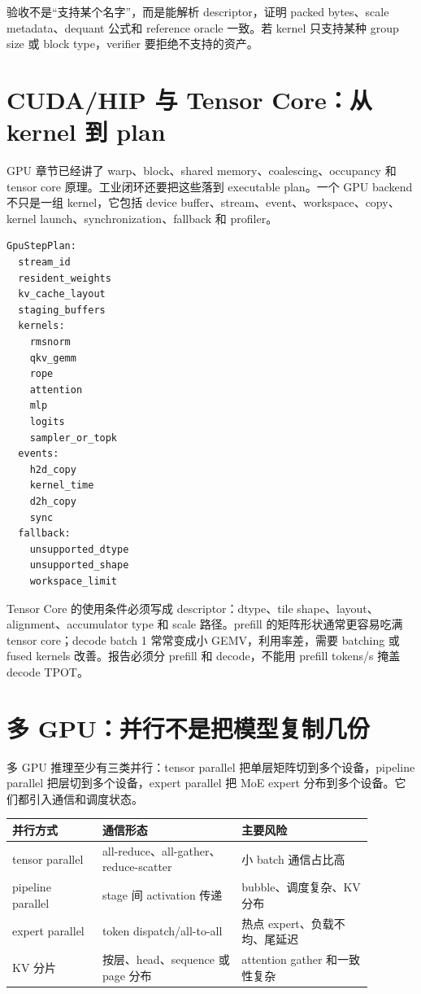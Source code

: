 验收不是“支持某个名字”，而是能解析 descriptor，证明 packed bytes、scale metadata、dequant 公式和 reference oracle 一致。若 kernel 只支持某种 group size 或 block type，verifier 要拒绝不支持的资产。

\section{CUDA/HIP 与 Tensor Core：从 kernel 到 plan}

GPU 章节已经讲了 warp、block、shared memory、coalescing、occupancy 和 tensor core 原理。工业闭环还要把这些落到 executable plan。一个 GPU backend 不只是一组 kernel，它包括 device buffer、stream、event、workspace、copy、kernel launch、synchronization、fallback 和 profiler。

\begin{lstlisting}[numbers=none,caption={GPU step plan}]
GpuStepPlan:
  stream_id
  resident_weights
  kv_cache_layout
  staging_buffers
  kernels:
    rmsnorm
    qkv_gemm
    rope
    attention
    mlp
    logits
    sampler_or_topk
  events:
    h2d_copy
    kernel_time
    d2h_copy
    sync
  fallback:
    unsupported_dtype
    unsupported_shape
    workspace_limit
\end{lstlisting}

Tensor Core 的使用条件必须写成 descriptor：dtype、tile shape、layout、alignment、accumulator type 和 scale 路径。prefill 的矩阵形状通常更容易吃满 tensor core；decode batch 1 常常变成小 GEMV，利用率差，需要 batching 或 fused kernels 改善。报告必须分 prefill 和 decode，不能用 prefill tokens/s 掩盖 decode TPOT。

\section{多 GPU：并行不是把模型复制几份}

多 GPU 推理至少有三类并行：tensor parallel 把单层矩阵切到多个设备，pipeline parallel 把层切到多个设备，expert parallel 把 MoE expert 分布到多个设备。它们都引入通信和调度状态。

\begin{center}
\small
\begin{tabular}{p{0.22\linewidth}p{0.34\linewidth}p{0.32\linewidth}}
\toprule
并行方式 & 通信形态 & 主要风险 \\
\midrule
tensor parallel & all-reduce、all-gather、reduce-scatter & 小 batch 通信占比高 \\
pipeline parallel & stage 间 activation 传递 & bubble、调度复杂、KV 分布 \\
expert parallel & token dispatch/all-to-all & 热点 expert、负载不均、尾延迟 \\
KV 分片 & 按层、head、sequence 或 page 分布 & attention gather 和一致性复杂 \\
\bottomrule
\end{tabular}
\end{center}

